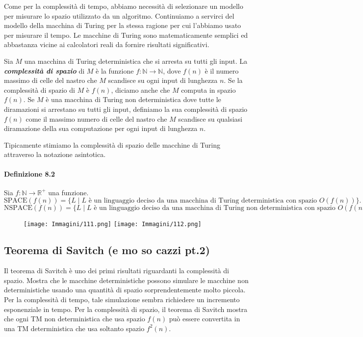 \documentclass{article}
\begin{document}
Come per la complessità di tempo, abbiamo necessità di selezionare un modello per misurare lo spazio utilizzato da un algoritmo.
Continuiamo a servirci del modello della macchina di Turing per la stessa ragione per cui l'abbiamo usato per misurare il tempo.
Le macchine di Turing sono matematicamente semplici ed abbastanza vicine ai calcolatori reali da fornire risultati significativi.

\begin{tcolorbox}[colback=yellow!5!white, colframe=yellow!50!black, title=\textbf{Definizione 8.1}]
    Sia $M$ una macchina di Turing deterministica che si arresta
    su tutti gli input. 
    La \textit{\textbf{complessità di spazio}} di $M$ è la funzione $f: \mathbb{N} \rightarrow \mathbb{N}$, dove  $f(n)$ è il numero massimo di celle del nastro che $M$ scandisce su ogni input di lunghezza $n$.
    Se la complessità di spazio di $M$ è $f(n)$, diciamo anche che $M$ computa in spazio $f(n)$.
    Se $M$ è una macchina di Turing non deterministica dove tutte le diramazioni si arrestano su tutti gli input, definiamo la sua complessità di spazio $f(n)$ come il massimo numero di celle del nastro che $M$ scandisce su qualsiasi diramazione della sua computazione per ogni input di lunghezza $n$.
\end{tcolorbox}

Tipicamente stimiamo la complessità di spazio delle macchine di Turing attraverso la notazione asintotica.

\paragraph*{Definizione 8.2}
\label{definizione-8.2}
\vspace{1em}
\text{}
\newline
Sia $f : \mathbb{N} \rightarrow \mathbb{R}^+$ una funzione.
\[
\text{SPACE}(f(n)) = \{L \mid L \text{ è un linguaggio deciso da una macchina di Turing deterministica con spazio } O(f(n))\}.
\]
\[
\text{NSPACE}(f(n)) = \{L \mid L \text{ è un linguaggio deciso da una macchina di Turing non deterministica con spazio } O(f(n))\}.
\]

\begin{figure}[H]
    \centering
    \texttt{[image: Immagini/111.png]}
    \texttt{[image: Immagini/112.png]}
    \label{fig:space-complexity}
\end{figure}

\subsection{Teorema di Savitch (e mo so cazzi pt.2)}
Il teorema di Savitch è uno dei primi risultati riguardanti la complessità di spazio. 
Mostra che le macchine deterministiche possono simulare le macchine non deterministiche usando una quantità di spazio sorprendentemente molto piccola.
Per la complessità di tempo, tale simulazione sembra richiedere un incremento esponenziale in tempo.
Per la complessità di spazio, il teorema di Savitch mostra che ogni TM non deterministica che usa spazio $f(n)$ può essere convertita in una TM deterministica che usa soltanto spazio $f^2(n)$.
\end{document}
